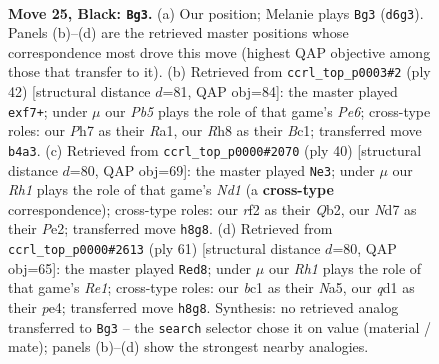 \documentclass[11pt]{article}
\begin{document}
\clearpage

\begin{figure}[p]\centering
\begin{subfigure}{0.46\textwidth}\centering
\resizebox{\linewidth}{!}{%
\newchessgame
\chessboard[
  setfen={r6r/3nk2p/1ppbp1p1/8/1p1P3P/P3P2q/RP3RN1/2BQ2K1 b - - 2 25},
  showmover=false,
  pgfstyle=straightmove, color=movearrow, markmove={d6-g3}
]}
\caption{}
\end{subfigure}\hfill
\begin{subfigure}{0.46\textwidth}\centering
\resizebox{\linewidth}{!}{%
\newchessgame
\chessboard[
  setfen={r4rk1/5pp1/pq1bP2p/1p2n3/3pQ1B1/1P6/P5PP/R1B2RK1 w - - 1 22},
  showmover=false,
  pgfstyle=straightmove, color=movearrow, markmove={e6-f7}
]}
\caption{}
\end{subfigure}
\\[4pt]
\begin{subfigure}{0.46\textwidth}\centering
\resizebox{\linewidth}{!}{%
\newchessgame
\chessboard[
  setfen={1nr2r1k/3bq1pp/2p5/p2Ppp2/8/P5P1/1Q2P1BP/2RN1RK1 w - - 0 21},
  showmover=false,
  pgfstyle=straightmove, color=movearrow, markmove={d1-e3}
]}
\caption{}
\end{subfigure}\hfill
\begin{subfigure}{0.46\textwidth}\centering
\resizebox{\linewidth}{!}{%
\newchessgame
\chessboard[
  setfen={2r1r1k1/1b3pp1/pp2p3/n2p4/2P1PP1P/2R3PK/PqN5/3RQB2 b - - 1 31},
  showmover=false,
  pgfstyle=straightmove, color=movearrow, markmove={e8-d8}
]}
\caption{}
\end{subfigure}
\caption{\textbf{Move 25, Black: \texttt{Bg3}.} (a) Our position; Melanie plays \texttt{Bg3} (\texttt{d6g3}). Panels (b)--(d) are the retrieved master positions whose correspondence most drove this move (highest QAP objective among those that transfer to it). (b) Retrieved from \texttt{ccrl\_top\_p0003\#2} (ply 42) [structural distance $d$=81, QAP obj=84]: the master played \texttt{exf7+}; under $\mu$ our \emph{Pb5} plays the role of that game's \emph{Pe6}; cross-type roles: our \emph{P}h7 as their \emph{R}a1, our \emph{R}h8 as their \emph{B}c1; transferred move \texttt{b4a3}. (c) Retrieved from \texttt{ccrl\_top\_p0000\#2070} (ply 40) [structural distance $d$=80, QAP obj=69]: the master played \texttt{Ne3}; under $\mu$ our \emph{Rh1} plays the role of that game's \emph{Nd1} (a \textbf{cross-type} correspondence); cross-type roles: our \emph{r}f2 as their \emph{Q}b2, our \emph{N}d7 as their \emph{P}e2; transferred move \texttt{h8g8}. (d) Retrieved from \texttt{ccrl\_top\_p0000\#2613} (ply 61) [structural distance $d$=80, QAP obj=65]: the master played \texttt{Red8}; under $\mu$ our \emph{Rh1} plays the role of that game's \emph{Re1}; cross-type roles: our \emph{b}c1 as their \emph{N}a5, our \emph{q}d1 as their \emph{p}e4; transferred move \texttt{h8g8}. Synthesis: no retrieved analog transferred to \texttt{Bg3} -- the \texttt{search} selector chose it on value (material / mate); panels (b)--(d) show the strongest nearby analogies.}
\label{fig:thought-m49}
\end{figure}
\end{document}
